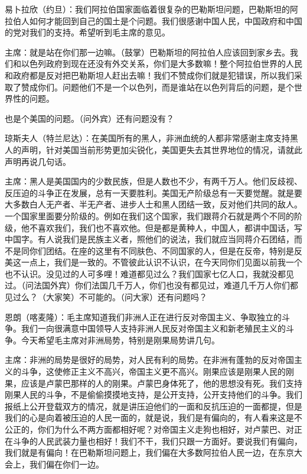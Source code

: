 易卜拉欣（约旦）：我们阿拉伯国家面临着很复杂的巴勒斯坦问题，巴勒斯坦的阿拉伯人如何才能回到自己的国土是个问题。我们很感谢中国人民，中国政府和中国的党对我们的支持。希望听到毛主席的意见。

主席：就是站在你们那一边嘛。（鼓掌）巴勒斯坦的阿拉伯人应该回到家乡去。我们和以色列政府到现在还没有外交关系，你们是大多数嘛！整个阿拉伯世界的人民和政府都是反对把巴勒斯坦人赶出去嘛！我们不赞成你们就是犯错误，所以我们采取了赞成你们。问题他们不是一个以色列，而是谁站在以色列背后的问题，是个世界性的问题。

也是个美国的问题。（问外宾）还有问题没有？

琼斯夫人（特兰尼达）：在美国所有的黑人，非洲血统的人都非常感谢主席支持黑人的声明，针对美国当前形势更加尖锐化，美国更失去其世界地位的情况，请就此声明再说几句话。

主席：黑人是美国国内的少数民族，但是人数也不少，有两千万人。他们反歧视、反压迫的斗争正在发展，总有一天要胜利。美国无产阶级总有一天要觉醒。就是要大多数白人无产者、半无产者、进步人士和黑人团结一致，反对他们共同的敌人。一个国家里面要分阶级的。例如在我们这个国家，我们跟蒋介石就是两个不同的阶级，他不喜欢我们，我们也不喜欢他。但是都是黄种人，中国人，都讲中国话，写中国字。有人说我们是民族主义者，照他们的说法，我们就应当同蒋介石团结，而不是同你们团结。在座的这里有不同肤色、不同国家的人，但是在反帝，特别是反美这一点上，我们是一致的。不管彼此认识不认识，在今天同你们见面以前我一个也不认识。没见过的人可多哩！难道都见过么？我们国家七亿人口，我就没都见过。（问法国外宾）你们法国几千万人，你们也没有都见过，难道几千万人你们都见过么？（大家笑）不可能的。（问大家）还有问题吗？

恩朗（喀麦隆）：毛主席知道我们非洲人正在进行反对帝国主义、争取独立的斗争。我们一向很满意中国领导人支持非洲人民反对帝国主义和新老殖民主义的斗争。今天希望毛主席对非洲局势，特别是刚果局势讲几句。

主席：非洲的局势是很好的局势，对人民有利的局势。在非洲有蓬勃的反对帝国主义的斗争，这使修正主义不高兴，帝国主义更不高兴。刚果应该是刚果人民的刚果，应该是卢蒙巴那样的人的刚果。卢蒙巴身体死了，他的思想没有死。我们支持刚果人民的斗争，不是偷偷摸摸地支持，是公开支持，公开支持他们的斗争。我们报纸上公开登载双方的情况，就是讲压迫他们的一面和反抗压迫的一面都提，但是我们的心是向着被压迫的人民一面的，就是说，我们是有偏向的，有人看来这是不公正的，你们为什么不两方面都相好呢？对帝国主义走狗也相好，对卢蒙巴、对正在斗争的人民武装力量也相好！我们不干，我们只跟一方面好。要说我们有偏向，我们就是有偏向！在巴勒斯坦问题上，我们偏在大多数阿拉伯人民一边，在东京大会上，我们偏在你们一边。

